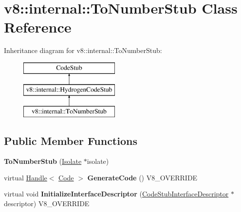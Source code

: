 \hypertarget{classv8_1_1internal_1_1_to_number_stub}{}\section{v8\+:\+:internal\+:\+:To\+Number\+Stub Class Reference}
\label{classv8_1_1internal_1_1_to_number_stub}
Inheritance diagram for v8\+:\+:internal\+:\+:To\+Number\+Stub\+:\begin{figure}[H]
\begin{center}
\leavevmode
\includegraphics[height=3.000000cm]{classv8_1_1internal_1_1_to_number_stub}
\end{center}
\end{figure}
\subsection*{Public Member Functions}
\begin{DoxyCompactItemize}
\item 
\hypertarget{classv8_1_1internal_1_1_to_number_stub_a20f633e66c1ee8331c306aafc837dd13}{}{\bfseries To\+Number\+Stub} (\hyperlink{classv8_1_1internal_1_1_isolate}{Isolate} $\ast$isolate)\label{classv8_1_1internal_1_1_to_number_stub_a20f633e66c1ee8331c306aafc837dd13}

\item 
\hypertarget{classv8_1_1internal_1_1_to_number_stub_addf8d88d725076a3572b327466224198}{}virtual \hyperlink{classv8_1_1internal_1_1_handle}{Handle}$<$ \hyperlink{classv8_1_1internal_1_1_code}{Code} $>$ {\bfseries Generate\+Code} () V8\+\_\+\+O\+V\+E\+R\+R\+I\+D\+E\label{classv8_1_1internal_1_1_to_number_stub_addf8d88d725076a3572b327466224198}

\item 
\hypertarget{classv8_1_1internal_1_1_to_number_stub_ae6b026ac0d690e7aa0e5d2efa148d54d}{}virtual void {\bfseries Initialize\+Interface\+Descriptor} (\hyperlink{classv8_1_1internal_1_1_code_stub_interface_descriptor}{Code\+Stub\+Interface\+Descriptor} $\ast$descriptor) V8\+\_\+\+O\+V\+E\+R\+R\+I\+D\+E\label{classv8_1_1internal_1_1_to_number_stub_ae6b026ac0d690e7aa0e5d2efa148d54d}

\end{DoxyCompactItemize}
